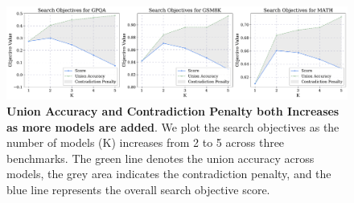 





\begin{figure}[hbtp]
    \centering
    \includegraphics[width=\textwidth]{Figures/search_summary_comparison.pdf}
    \vspace{-20pt}
    \caption{\textbf{Union Accuracy and Contradiction Penalty both Increases as more models are added}. We plot the search objectives as the number of models (K) increases from 2 to 5 across three benchmarks. The green line denotes the union accuracy across models, the grey area indicates the contradiction penalty, and the blue line represents the overall search objective score. }
    \label{fig:search_objectives}
\end{figure}



